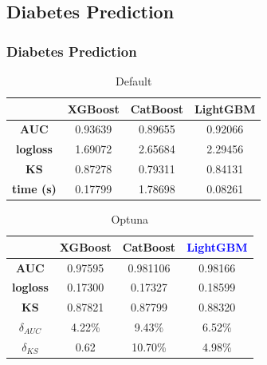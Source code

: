 \documentclass{beamer}
\begin{document}
\subsection{Diabetes Prediction}
\begin{frame}
\frametitle{Diabetes Prediction}
\begin{table}[H]
\centering
\begin{tabular}{|c|c|c|c|}
\hline
	& \textbf{XGBoost} &\textbf{CatBoost} & \textbf{LightGBM} \\
\hline
\textbf{AUC}	&0.93639	& 0.89655	& 0.92066 \\
\hline
\textbf{logloss}	& 1.69072 & 2.65684	& 2.29456 \\
\hline
\textbf{KS}	& 0.87278	& 0.79311	& 0.84131 \\
\hline
\textbf{time (s)}	& 0.17799 &	 1.78698 &	0.08261 \\
\hline
\end{tabular}
\caption{Default}\label{res:dia:1}
\end{table}
\begin{table}[H]
\centering
\begin{tabular}{|c|c|c|c|}
\hline
	& \textbf{XGBoost} &\textbf{CatBoost} & \textcolor{blue}{\textbf{LightGBM}} \\
\hline
\textbf{AUC}	& 0.97595	&0.981106	&0.98166\\
\hline
\textbf{logloss}	& 0.17300&	0.17327	&0.18599\\
\hline
\textbf{KS}	& 0.87821&	0.87799&	0.88320\\
\hline
$\delta_{AUC}$	& 4.22\% & 9.43\%	   &     6.52\% \\
\hline
$\delta_{KS}$	&   0.62 	&  10.70\% &	4.98\%\\
\hline
\end{tabular}
\caption{Optuna}\label{res:dia:op}
\end{table}
\end{frame}
\end{document}
